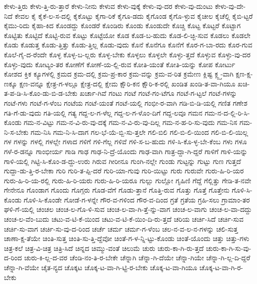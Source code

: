 {ಕೇಳು-ತ್ತಿರು
ಕೇಳು-ತ್ತಿ-ರು-ತ್ತಾರೆ
ಕೇಳು-ನೀನು
ಕೇಳುವ
ಕೇಳು-ವುಕ್ಕೆ
ಕೇಳು-ವು-ದರ
ಕೇಳು-ವು-ದುಂಟು
ಕೇಳು-ವು-ದೇ-ನಿದೆ
ಕೇವಲ
ಕೈ
ಕೈಕೆ-ಲ-ಸ-ದಲ್ಲಿ
ಕೈಕೊಟ್ಟು
ಕೈಗಾ-ರಿಕೆ
ಕೈಗೂ-ಡದು
ಕೈಗೊಂಡ
ಕೈಗೊ-ಳ್ಳುವ
ಕೈಚೀಲ
ಕೈಚೆಲ್ಲಿ
ಕೈಬಿ-ಟ್ಟರೆ
ಕೈಮು-ರಿದು
ಕೈಹಾ-ಕಿದ
ಕೊಂಡದ್ದು
ಕೊಂಡರೆ
ಕೊಂಡಿರು
ಕೊಂಡು
ಕೊಂಡುದೇ
ಕೊಚ್ಚಿ
ಕೊಟ್ಟ
ಕೊಟ್ಟರೆ
ಕೊಟ್ಟಾಗ
ಕೊಟ್ಟಿತು
ಕೊಟ್ಟಿದೆ
ಕೊಟ್ಟಿ-ರುವ
ಕೊಟ್ಟು
ಕೊಟ್ಟೆಯೋ
ಕೊಡ
ಕೊಡ-ಬ-ಹುದು
ಕೊಡ-ಲಿ-ಚ್ಛಿ-ಸುವ
ಕೊಡಲು
ಕೊಡಲೇ
ಕೊಡು
ಕೊಡುತ್ತ
ಕೊಡು-ತ್ತಿತ್ತು
ಕೊಡು-ತ್ತಿಲ್ಲ
ಕೊಡು-ವುದು
ಕೊನೆ
ಕೊನೆಗೂ
ಕೊನೆಗೆ
ಕೊರ-ಗ-ಬಾ-ರದು
ಕೊರ-ಗುವ
ಕೊಲೆ-ಗೈ-ದ-ರೆಂದೇ
ಕೊಳ್ಳ
ಕೊಳ್ಳ-ಬ-ಲ್ಲರು
ಕೊಳ್ಳ-ಬೇಕು
ಕೊಳ್ಳಲು
ಕೊಳ್ಳಲೇ
ಕೊಳ್ಳು-ತ್ತದೆ
ಕೊಳ್ಳುವ
ಕೊಳ್ಳು-ವು-ದರ
ಕೊಳ್ಳು-ವುದು
ಕೋಟ್ಯಂ-ತರ
ಕೋಣೆಗೆ
ಕೋಣೆ-ಯ-ಲ್ಲಿ-ರುವ
ಕೋತಿ-ಯಂತೆ
ಕೋತಿ-ಯನ್ನು
ಕೋಪ
ಕೋರ್ಟು
ಕೋಶದ
ಕ್ತಿಕ
ಕ್ಯೂಗಳಲ್ಲಿ
ಕ್ರಮದ
ಕ್ರಮ-ದಲ್ಲಿ
ಕ್ರಮ-ಪ್ರ-ಕಾರ
ಕ್ರಮ-ವನ್ನು
ಕ್ರಮ-ವ-ರಿತ
ಕ್ರಮೇಣ
ಕ್ಲಿಷ್ಟ
ಕ್ಲ್ಪ್ತ-ವಾಗಿ
ಕ್ಷಣ-ಕ್ಷ-ಣಕ್ಕೂ
ಕ್ಷಣ-ವನ್ನೂ
ಕ್ಷೇತ್ರ-ಗ-ಳಲ್ಲೂ
ಕ್ಷೇತ್ರ-ದಲ್ಲಿ
ಕ್ಷೇಮ
ಕ್ಷೌರಿ-ಕನ
ಕ್ಷೌರಿ-ಕ-ರಲ್ಲಿ
ಖಂಡಿತ
ಖಂಡಿ-ತ-ವಾ-ಗಿಯೂ
ಖಚಿ-ತ-ಪ-ಡಿ-ಸಿ-ಕೊಂ-ಡು-ಬಿ-ಡ-ಬೇಕು
ಖರ್ಚಾ-ಗಿವೆ
ಗಂಟು
ಗಂಟೆ
ಗಂಟೆ-ಗಂ-ಟೆಗೂ
ಗಂಟೆ-ಗ-ಟ್ಟಲೆ
ಗಂಟೆ-ಗಳನ್ನು
ಗಂಟೆ-ಗಳು
ಗಂಟೆ-ಗ-ಳೆಂಬ
ಗಂಟೆಯ
ಗಂಟೆ-ಯಂತೆ
ಗಂಟೆ-ಯಲ್ಲಿ
ಗಂಭೀ-ರ-ವಾಗಿ
ಗಡಿ-ಬಿ-ಡಿ-ಯಲ್ಲಿ
ಗಣಿತ
ಗಣೇಶ
ಗತಿ-ಗೆ-ಡು-ವುದು
ಗತಿ-ಯಲ್ಲಿ
ಗತ್ಯ
ಗದ್ದ-ಲ-ಗ-ಳೆಲ್ಲ
ಗದ್ದ-ಲ-ಗ-ಳೊಂ-ದಿಗೆ
ಗದ್ದ-ಲವೂ
ಗಮನ
ಗಮ-ನ-ದ-ಲ್ಲಿ-ರಿ-ಸಿ-ಕೊಂಡು
ಗಮ-ನ-ವಿಟ್ಟು
ಗಮ-ನ-ವಿ-ರು-ವು-ದಕ್ಕೆ
ಗಮ-ನ-ವಿ-ರು-ವು-ದಿಲ್ಲ
ಗಮ-ನ-ಹ-ರಿ-ಸು-ವುದು
ಗಮ-ನಿಸ
ಗಮ-ನಿ-ಸ-ಬೇಕು
ಗಮ-ನಿಸಿ
ಗಮ-ನಿ-ಸಿ-ದಾಗ
ಗಲ-ಭೆ-ಯೆ-ಬ್ಬಿ-ಸು-ತ್ತಲೇ
ಗಲಿ-ಬಿಲಿ
ಗಲಿ-ಬಿ-ಲಿ-ಯಿಂದ
ಗಲಿ-ಬಿ-ಲಿ-ಯಿಲ್ಲ
ಗಳ
ಗಳನ್ನು
ಗಳಲ್ಲಿ
ಗಳಲ್ಲೇ
ಗಳಾದ
ಗಳಿಗೆ
ಗಳಿ-ಗೆಲ್ಲ
ಗಳಿವೆ
ಗಳಿ-ಸ-ಬ-ಹುದು
ಗಳಿ-ಸಿ-ಕೊ-ಳ್ಳ-ಬೇ-ಕೆಂಬ
ಗಳು
ಗಳೂ
ಗಳೆ-ರ-ಡನ್ನೂ
ಗಾಂಭೀರ್ಯ
ಗಾಡಿ
ಗಾಢ
ಗಾಢ-ನಿ-ದ್ರೆ-ಯೊಂದು
ಗಾಢ-ವಾಗಿ
ಗಾತ್ರ-ದ್ದಾ-ಗಿ-ದ್ದರೆ
ಗಾಳಿಗೆ
ಗಾಳಿ-ಯನ್ನು
ಗಾಳಿ-ಯಲ್ಲಿ
ಗಿಟ್ಟಿ-ಸಿ-ಕೊಂ-ಡ-ದ್ದು-ಉರು
ಗಿರುವ
ಗೀರೀನೂ
ಗುಂಗಿ-ನಲ್ಲೇ
ಗುಂಡು
ಗುಟ್ಟನ್ನು
ಗುಟ್ಟು
ಗುಣ
ಗುತ್ತದೆ
ಗುದ್ದಾ-ಡು-ತ್ತಿ-ರ-ಬೇಕಾ
ಗುರಿ
ಗುರಿ-ತ-ಪ್ಪಿ-ದರೆ
ಗುರಿ-ಯಾ-ಗುವು
ಗುರಿ-ಯಿಟ್ಟು
ಗುರು
ಗುರುವೇ
ಗುರು-ಹಿ-ರಿ-ಯರ
ಗುರು-ಹಿ-ರಿ-ಯ-ರಲ್ಲಿ
ಗುರು-ಹಿ-ರಿ-ಯರು
ಗುರು-ಹಿ-ರಿ-ಯರೂ
ಗುಲ್ಲು
ಗುಲ್ಲೋ
ಗೃಹಿಣಿ
ಗೆದ್ದೆ
ಗೆಲ್ಲಿತ್ತು
ಗೇಡಿ-ತ-ನವೇ
ಗೇನೇನೂ
ಗೊಂಡಾಗ
ಗೊಂದು
ಗೊಗ್ಗರು
ಗೊಡ-ವೆಗೆ
ಗೊಡು-ತ್ತಾನೆ
ಗೊತ್ತಿ-ರುವ
ಗೊತ್ತು
ಗೊತ್ತೆ
ಗೊತ್ತೇನು
ಗೊಳಿ-ಸಿ-ಕೊಂಡು
ಗೊಳಿ-ಸಿ-ಕೊಂಡೇ
ಗೋಡೆ-ಗ-ಳನ್ನೇ
ಗೌರ-ವ-ಗಳಿಂದ
ಗೌರ-ವ-ದಿಂದ
ಗ್ರತೆ
ಗ್ರತೆಯ
ಗ್ರಹಿ-ಸಲು
ಗ್ರಾಮಾಂ-ತರ
ಘಳಿ-ಗೆ-ಯಲ್ಲಿ
ಚಂಚಲ
ಚಂಚ-ಲ-ಗೊ-ಳಿ-ಸುವ
ಚಂಚ-ಲ-ವಾ-ಗಿ-ತ್ತೆ-ನ್ನು-ವಾಗ
ಚಂಚ-ಲ-ವಾಗು
ಚಂಚ-ಲ-ವಾ-ದದ್ದು
ಚಂಚ-ಲ-ವೆಂ-ಬುದು
ಚಟು-ವ-ಟಿ-ಕೆ-ಯಿಂದ
ಚಟು-ವ-ಟಿ-ಕೆ-ಯಿಂ-ದಿ-ರು-ತ್ತದೆ
ಚರಿಯ
ಚರ್ಚಿ-ಸಿದೆ
ಚರ್ಚಿ-ಸುವ
ಚರ್ಚಿ-ಸು-ವಾಗ
ಚರ್ಚಿ-ಸು-ವು-ದ-ರಿಂದ
ಚರ್ಚೆ
ಚರ್ಮ
ಚರ್ಮ-ಗ-ಳೆಂಬ
ಚಲ-ನ-ವ-ಲ-ನ-ಗಳನ್ನು
ಚಲಿ-ಸುತ್ತ
ಚಾಣಾ-ಕ್ಷ-ತೆಯೇ
ಚಿಂತಿ-ಸುತ್ತ
ಚಿಂತಿ-ಸು-ತ್ತಿ-ದ್ದೆವೋ
ಚಿಂತೆ-ಗ-ಳ-ನ್ನಿ-ಟ್ಟು-ಕೊಂಡು
ಚಿಂತೆ-ಯೊಂದು
ಚಿತ್ತು
ಚಿತ್ತು-ಗಳು
ಚಿತ್ರ-ಕಲೆ
ಚಿತ್ರ-ವಿ-ಚಿತ್ರ
ಚಿತ್ರಿ-ಸಿದೆ
ಚಿನ್ನದ
ಚಿಮ್ಮು-ವಂತೆ
ಚಿಲುಮೆ
ಚುರು
ಚುರು-ಕಾ-ಗಿ-ರು-ತ್ತದೆ
ಚುರು-ಕಾ-ಗಿ-ಸು-ವು-ದ-ರಿಂದ
ಚುರು-ಕಿ-ಲ್ಲ-ದ-ವರ
ಚೆಂಡಿ-ನಂ-ತಿ-ರ-ಬೇಕೇ
ಚೆನ್ನಾಗಿ
ಚೆನ್ನಾ-ಗಿ-ದೆಯೇ
ಚೆನ್ನಾ-ಗಿಯೇ
ಚೆನ್ನಾ-ಗಿ-ಲ್ಲ-ದಿ-ದ್ದರೆ
ಚೆನ್ನಾ-ಗಿ-ವೆಯೇ
ಚೈತ-ನ್ಯದ
ಚೊಕ್ಕಟ
ಚೊಕ್ಕ-ಟ-ವಾ-ಗಿ-ಟ್ಟಿ-ರ-ಬೇಕು
ಚೊಕ್ಕ-ಟ-ವಾ-ಗಿಯೂ
ಚೊಕ್ಕ-ಟ-ವಾ-ಗಿ-ರ-ಬೇಕು
}
